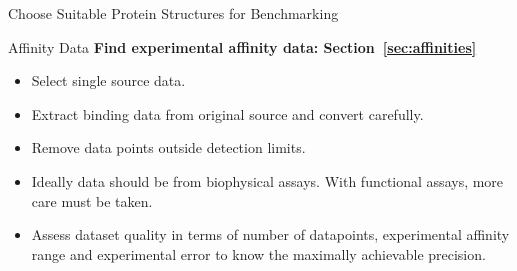 \documentclass[9pt,bestpractices]{livecoms}
\begin{document}
\begin{Checklists*}[hp!]
\begin{checklist}{Choose Suitable Protein Structures for Benchmarking}
\begin{itemize}
    \end{itemize}
\end{checklist}

\begin{checklist}{Affinity Data}
\textbf{Find experimental affinity data: Section~\ref{sec:affinities}}
    \begin{itemize}
    \item Select single source data.
    \item Extract binding data from original source and convert carefully.
    \item Remove data points outside detection limits.
    \item Ideally data should be from biophysical assays. With functional assays, more care must be taken.
    \item Assess dataset quality in terms of number of datapoints, experimental affinity range and experimental error to know the maximally achievable precision.
    \end{itemize}
\end{checklist}
\end{Checklists*}
\end{document}
